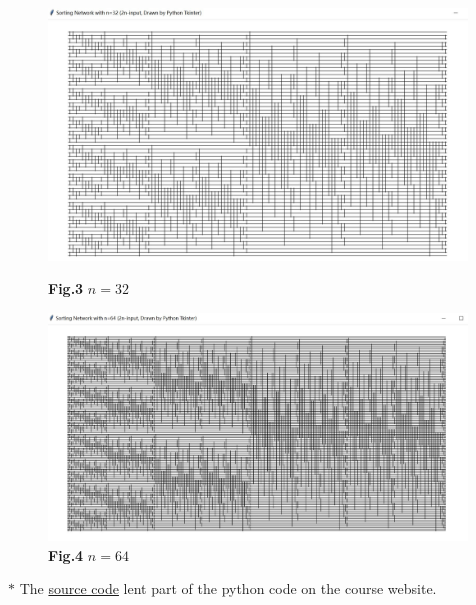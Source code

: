 \documentclass[12pt,a4paper,UTF8]{article}
\theoremstyle{definition}
\begin{document}
\begin{enumerate}
\begin{enumerate}
    	\begin{figure}[htbp]
    		\begin{minipage}[h]{0.48\textwidth}
    			\centering
    			\includegraphics[width=0.99\textwidth]{Lab02-YijiaDiao-32.pdf}
    			\caption*{\textbf{Fig.3} $n = 32$} \label{Fig-32}
    		\end{minipage}
    		\hspace{5mm}
    		\begin{minipage}[h]{0.54\textwidth}
    			\centering
    			\includegraphics[width=0.99\textwidth]{Lab02-YijiaDiao-64.pdf}
    			\caption*{\textbf{Fig.4} $n = 64$} \label{Fig-64}
    		\end{minipage}
    	\end{figure}	
    	\footnotesize{$*$ The \href{run:Lab02-YijiaDiao-OddEvenSortingNetwork.py}{source code} lent part of the python code on the course website.}\\
    	

\end{enumerate}
\end{enumerate}
\end{document}
